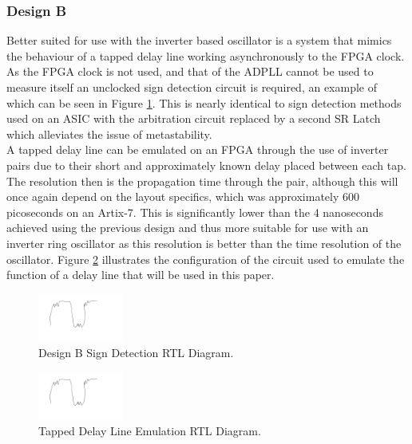 \documentclass[conference]{IEEEtran}
\begin{document}
\subsubsection*{Design B}
Better suited for use with the inverter based oscillator is a system that mimics the behaviour of a tapped delay line working asynchronously to the FPGA clock. As the FPGA clock is not used, and that of the ADPLL cannot be used to measure itself an unclocked sign detection circuit is required, an example of which can be seen in Figure \ref{fig:segn_pdetdl}. This is nearly identical to sign detection methods used on an ASIC with the arbitration circuit replaced by a second SR Latch which alleviates the issue of metastability.\\
A tapped delay line can be emulated on an FPGA through the use of inverter pairs due to their short and approximately known delay placed between each tap.
The resolution then is the propagation time through the pair, although this will once again depend on the layout specifics, which was approximately 600 picoseconds on an Artix-7. This is significantly lower than the 4 nanoseconds achieved using the previous design and thus more suitable for use with an inverter ring oscillator as this resolution is better than the time resolution of the oscillator. Figure \ref{fig:num_pdetdl} illustrates the configuration of the circuit used to emulate the function of a delay line that will be used in this paper.
\begin{figure}[h]
    \centering
    \includegraphics[width=0.25\textwidth]{../bad_waveform}
    \caption{Design B Sign Detection RTL Diagram.}
    \label{fig:segn_pdetdl}
\end{figure}
\begin{figure}[h]
    \centering
    \includegraphics[width=0.25\textwidth]{../bad_waveform}
    \caption{Tapped Delay Line Emulation RTL Diagram.}
    \label{fig:num_pdetdl}
\end{figure}

\newpage
 

\end{document}
